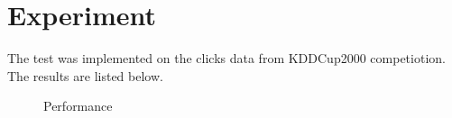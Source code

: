 \documentclass[journal]{IEEEtran}
\begin{document}
\section{Experiment}
The test was implemented on the clicks data from KDDCup2000 competiotion. The results are listed below.
\begin{figure}[H]
\caption*{Performance}
\end{figure}
\end{document}
